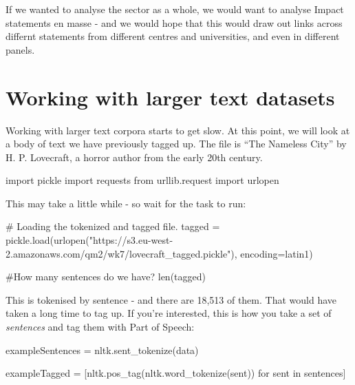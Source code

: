 \documentclass[
  letterpaper,
  DIV=11,
  numbers=noendperiod]{scrreprt}
\newenvironment{Shaded}{\begin{snugshade}}{\end{snugshade}}
\newcommand{\BuiltInTok}[1]{\textcolor[rgb]{0.00,0.23,0.31}{#1}}
\newcommand{\CommentTok}[1]{\textcolor[rgb]{0.37,0.37,0.37}{#1}}
\newcommand{\ControlFlowTok}[1]{\textcolor[rgb]{0.00,0.23,0.31}{#1}}
\newcommand{\ImportTok}[1]{\textcolor[rgb]{0.00,0.46,0.62}{#1}}
\newcommand{\KeywordTok}[1]{\textcolor[rgb]{0.00,0.23,0.31}{#1}}
\newcommand{\NormalTok}[1]{\textcolor[rgb]{0.00,0.23,0.31}{#1}}
\newcommand{\OperatorTok}[1]{\textcolor[rgb]{0.37,0.37,0.37}{#1}}
\newcommand{\StringTok}[1]{\textcolor[rgb]{0.13,0.47,0.30}{#1}}
\begin{document}
If we wanted to analyse the sector as a whole, we would want to analyse
Impact statements en masse - and we would hope that this would draw out
links across differnt statements from different centres and
universities, and even in different panels.

\hypertarget{working-with-larger-text-datasets}{%
\section{Working with larger text
datasets}\label{working-with-larger-text-datasets}}

Working with larger text corpora starts to get slow. At this point, we
will look at a body of text we have previously tagged up. The file is
``The Nameless City'' by H. P. Lovecraft, a horror author from the early
20th century.

\begin{Shaded}
\begin{Highlighting}[]
\ImportTok{import}\NormalTok{ pickle}
\ImportTok{import}\NormalTok{ requests}
\ImportTok{from}\NormalTok{ urllib.request }\ImportTok{import}\NormalTok{ urlopen}
\end{Highlighting}
\end{Shaded}

This may take a little while - so wait for the task to run:

\begin{Shaded}
\begin{Highlighting}[]
\CommentTok{\# Loading the tokenized and tagged file. }
\NormalTok{tagged }\OperatorTok{=}\NormalTok{ pickle.load(urlopen(}\StringTok{"https://s3.eu{-}west{-}2.amazonaws.com/qm2/wk7/lovecraft\_tagged.pickle"}\NormalTok{), encoding}\OperatorTok{=}\StringTok{\textquotesingle{}latin1\textquotesingle{}}\NormalTok{)}

\CommentTok{\#How many sentences do we have?}
\BuiltInTok{len}\NormalTok{(tagged)}
\end{Highlighting}
\end{Shaded}

This is tokenised by sentence - and there are 18,513 of them. That would
have taken a long time to tag up. If you're interested, this is how you
take a set of \emph{sentences} and tag them with Part of Speech:

\begin{Shaded}
\begin{Highlighting}[]
\NormalTok{exampleSentences }\OperatorTok{=}\NormalTok{ nltk.sent\_tokenize(data)}
  
\NormalTok{exampleTagged }\OperatorTok{=}\NormalTok{ [nltk.pos\_tag(nltk.word\_tokenize(sent)) }\ControlFlowTok{for}\NormalTok{ sent }\KeywordTok{in}\NormalTok{ sentences]}
\end{Highlighting}
\end{Shaded}
\end{document}
